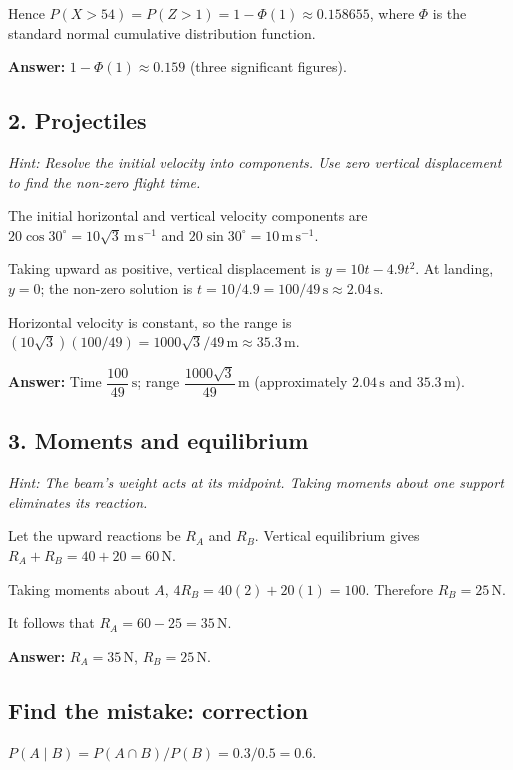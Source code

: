 \documentclass[10pt,a4paper]{article}
\begin{document}
Hence \(P(X>54)=P(Z>1)=1-\Phi(1)\approx0.158655\), where \(\Phi\) is the standard normal cumulative distribution function.

\textbf{Answer:} \(1-\Phi(1)\approx0.159\) (three significant figures).

\subsection*{2. Projectiles}
\textit{Hint: Resolve the initial velocity into components. Use zero vertical displacement to find the non-zero flight time.}\par
The initial horizontal and vertical velocity components are \(20\cos30^\circ=10\sqrt3\,\mathrm{m\,s^{-1}}\) and \(20\sin30^\circ=10\,\mathrm{m\,s^{-1}}\).

Taking upward as positive, vertical displacement is \(y=10t-4.9t^2\). At landing, \(y=0\); the non-zero solution is \(t=10/4.9=100/49\,\mathrm{s}\approx2.04\,\mathrm{s}\).

Horizontal velocity is constant, so the range is \((10\sqrt3)(100/49)=1000\sqrt3/49\,\mathrm{m}\approx35.3\,\mathrm{m}\).

\textbf{Answer:} Time \(\dfrac{100}{49}\,\mathrm{s}\); range \(\dfrac{1000\sqrt3}{49}\,\mathrm{m}\) (approximately \(2.04\,\mathrm{s}\) and \(35.3\,\mathrm{m}\)).

\subsection*{3. Moments and equilibrium}
\textit{Hint: The beam's weight acts at its midpoint. Taking moments about one support eliminates its reaction.}\par
Let the upward reactions be \(R_A\) and \(R_B\). Vertical equilibrium gives \(R_A+R_B=40+20=60\,\mathrm{N}\).

Taking moments about \(A\), \(4R_B=40(2)+20(1)=100\). Therefore \(R_B=25\,\mathrm{N}\).

It follows that \(R_A=60-25=35\,\mathrm{N}\).

\textbf{Answer:} \(R_A=35\,\mathrm{N}\), \(R_B=25\,\mathrm{N}\).

\subsection*{Find the mistake: correction}
\(P(A\mid B)=P(A\cap B)/P(B)=0.3/0.5=0.6\).
\end{document}

